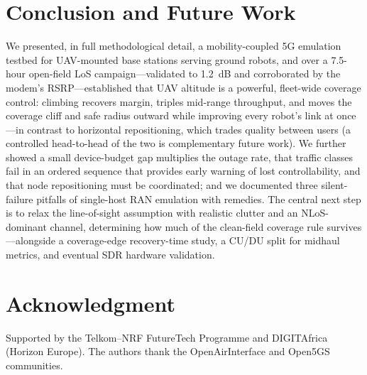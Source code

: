 \documentclass[10pt, conference]{IEEEtran}
\begin{document}
\section{Conclusion and Future Work}
\label{sec:conclusion}
We presented, in full methodological detail, a mobility-coupled 5G emulation testbed for UAV-mounted base stations serving ground robots, and over a 7.5-hour open-field LoS campaign---validated to 1.2~dB and corroborated by the modem's RSRP---established that UAV altitude is a powerful, fleet-wide coverage control: climbing recovers margin, triples mid-range throughput, and moves the coverage cliff and safe radius outward while improving every robot's link at once---in contrast to horizontal repositioning, which trades quality between users (a controlled head-to-head of the two is complementary future work). We further showed a small device-budget gap multiplies the outage rate, that traffic classes fail in an ordered sequence that provides early warning of lost controllability, and that node repositioning must be coordinated; and we documented three silent-failure pitfalls of single-host RAN emulation with remedies. The central next step is to relax the line-of-sight assumption with realistic clutter and an NLoS-dominant channel, determining how much of the clean-field coverage rule survives---alongside a coverage-edge recovery-time study, a CU/DU split for midhaul metrics, and eventual SDR hardware validation.

\section*{Acknowledgment}
Supported by the Telkom--NRF FutureTech Programme and DIGITAfrica (Horizon Europe). The authors thank the OpenAirInterface and Open5GS communities.
\end{document}

